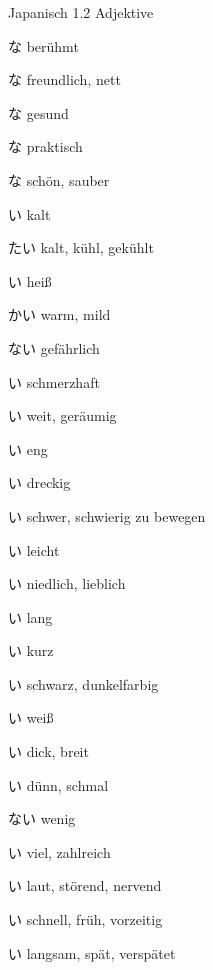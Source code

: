 \begin{multicols*}{2}
\begin{flushleft}
\begin{labeling}{Japanisch 1.2 Adjektive}
	\item [\ruby{有名}{ゆうめい}な] berühmt
	\item [\ruby{親切}{しんせつ}な] freundlich, nett
	\item [\ruby{元気}{げんき}な] gesund
	\item [\ruby{便利}{べんり}な] praktisch
	\item [\ruby{綺麗}{きれい}な] schön, sauber
	
	\item [\ruby{寒}{さむ}い] kalt
	\item [\ruby{冷}{つめ}たい] kalt, kühl, gekühlt
	\item [\ruby{暑}{あつ}い] heiß
	\item [\ruby{暖}{あたた}かい] warm, mild
	
	\item [\ruby{危}{あぶ}ない] gefährlich
	\item [\ruby{痛}{いた}い] schmerzhaft
	
	\item [\ruby{広}{ひろ}い] weit, geräumig
	\item [\ruby{狭}{せま}い] eng
	
	\item [\ruby{汚}{きたな}い] dreckig
	
	\item [\ruby{重}{おも}い] schwer, schwierig zu bewegen
	\item [\ruby{軽}{かる}い] leicht
	
	\item [\ruby{可愛}{かわい}い] niedlich, lieblich
	
	\item [\ruby{長}{なが}い] lang
	\item [\ruby{短}{みじか}い] kurz
	
	\item [\ruby{黒}{くろ}い] schwarz, dunkelfarbig
	\item [\ruby{白}{しろ}い] weiß
	
	\item [\ruby{太}{ふと}い] dick, breit
	\item [\ruby{細}{ほそ}い] dünn, schmal
	
	\item [\ruby{少}{すく}ない] wenig
	\item [\ruby{多}{おお}い] viel, zahlreich
	
	\item [\ruby{煩}{うるさ}い] laut, störend, nervend
	
	\item [\ruby{早}{はや}い] schnell, früh, vorzeitig
	\item [\ruby{遅}{おそ}い] langsam, spät, verspätet
	

\end{labeling}
\end{flushleft}
\end{multicols*}
